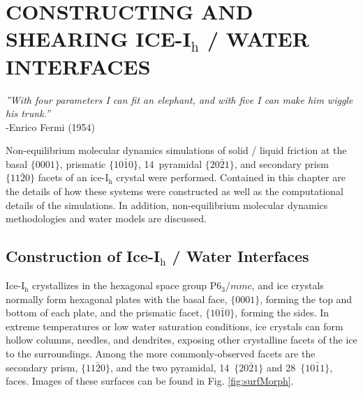 

\chapter{CONSTRUCTING AND SHEARING ICE-I$_\mathrm{h}$ / WATER INTERFACES}\label{chap:Methods}

\begin{flushright}
\textit{''With four parameters I can fit an elephant, and with five I
  can make him wiggle his trunk.''} \\
-Enrico Fermi (1954) \\
\end{flushright}


Non-equilibrium molecular dynamics simulations of solid / liquid
friction at the basal $\{0001\}$, prismatic $\{10\bar{1}0\}$,
14\degree~pyramidal $\{20\bar{2}1\}$, and secondary prism
$\{11\bar{2}0\}$ facets of an ice-I$_\mathrm{h}$ crystal were
performed. Contained in this chapter are the details of how these
systems were constructed as well as the computational details
of the simulations. In addition, non-equilibrium molecular dynamics
methodologies and water models are discussed.


\section{Construction of Ice-I$_\mathrm{h}$ / Water Interfaces}

Ice-I$_\mathrm{h}$ crystallizes in the hexagonal space group
P$6_3/mmc$, and ice crystals normally form hexagonal plates with the
basal face, $\{0001\}$, forming the top and bottom of each plate, and
the prismatic facet, $\{10\bar{1}0\}$, forming the sides.  In extreme
temperatures or low water saturation conditions, ice crystals can form
hollow columns, needles, and dendrites, exposing other crystalline
facets of the ice to the surroundings.  Among the more
commonly-observed facets are the secondary prism, $\{11\bar{2}0\}$,
and the two pyramidal, 14\degree~$\{20\bar{2}1\}$ and
28\degree~$\{10\bar{1}1\}$, faces. Images of these surfaces can
be found in Fig. \ref{fig:surfMorph}.


